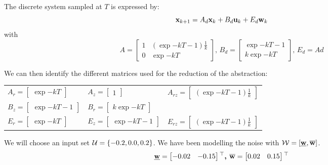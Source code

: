 \newcommand{\dt}{T}
The discrete system sampled at $\dt$ is expressed by:
\begin{equation}
 \mathbf{x}_{k+1} = A_d  \mathbf{x}_k + B_d  \mathbf{u}_k + E_d  \mathbf{w}_k
\end{equation}
with
\begin{equation*} \label{eqn:sec_int_disc}
A = \begin{bmatrix}
1 & (\exp{-k \dt} - 1)\frac{1}{k}\\ 
0 & \exp{-k\dt}
\end{bmatrix}
\textrm{, }
B_d = \begin{bmatrix}
\exp{-k \dt} - 1 \\ 
k \exp{-k \dt}
\end{bmatrix}
\textrm{, }
E_d = Ad
\end{equation*}

We can then identify the different matrices used for the reduction of the abstraction:\\
\begin{tabular}{lll}
$A_r =  \begin{bmatrix} \exp{-k\dt} \end{bmatrix} $
&
$A_z =  \begin{bmatrix} 1 \end{bmatrix} $
&
$A_{rz} =  \begin{bmatrix} (\exp{-k \dt} - 1)\frac{1}{k} \end{bmatrix}$
\\
$B_z =  \begin{bmatrix} \exp{-k \dt} - 1 \end{bmatrix} $
&
$B_r =  \begin{bmatrix} k \exp{-k\dt} \end{bmatrix} $
&
\\
$E_r =  \begin{bmatrix} \exp{-k\dt} \end{bmatrix} $
&
$E_z =  \begin{bmatrix} \exp{-k \dt} - 1 \end{bmatrix} $
&
$E_{rz} =  \begin{bmatrix} (\exp{-k \dt} - 1)\frac{1}{k} \end{bmatrix}$
\end{tabular}

We will choose an input set $\mathcal{U} = \{-0.2,0.0,0.2\}$.
We have been modelling the noise with $\mathcal{W} = [\underline{ \mathbf{w}},\overline{ \mathbf{w}}]$.
\begin{equation}
\underline{ \mathbf{w}} = \begin{bmatrix} -0.02&-0.15 \end{bmatrix} {}^\top
\textbf{, }
\overline{ \mathbf{w}} = \begin{bmatrix}  0.02& 0.15 \end{bmatrix} {}^\top
\end{equation}

